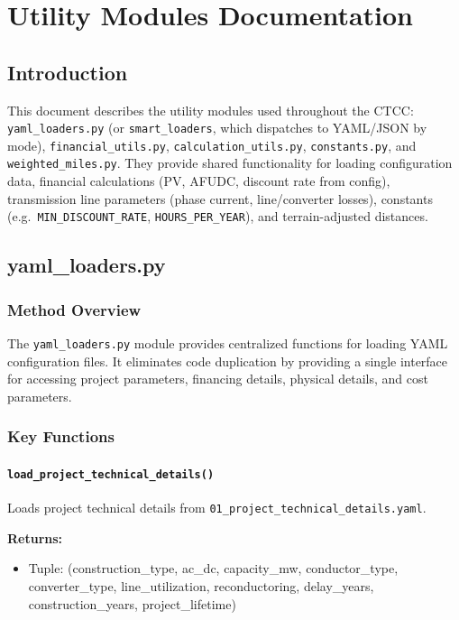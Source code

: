 \documentclass[ctcc_full_documentation.tex]{subfiles}
\begin{document}
\chapter{Utility Modules Documentation}

\section{Introduction}

This document describes the utility modules used throughout the CTCC: \texttt{yaml\_loaders.py} (or \texttt{smart\_loaders}, which dispatches to YAML/JSON by mode), \texttt{financial\_utils.py}, \texttt{calculation\_utils.py}, \texttt{constants.py}, and \texttt{weighted\_miles.py}. They provide shared functionality for loading configuration data, financial calculations (PV, AFUDC, discount rate from config), transmission line parameters (phase current, line/converter losses), constants (e.g.\ \texttt{MIN\_DISCOUNT\_RATE}, \texttt{HOURS\_PER\_YEAR}), and terrain-adjusted distances.

\section{yaml\_loaders.py}

\subsection{Method Overview}

The \texttt{yaml\_loaders.py} module provides centralized functions for loading YAML configuration files. It eliminates code duplication by providing a single interface for accessing project parameters, financing details, physical details, and cost parameters.

\subsection{Key Functions}

\subsubsection{\texttt{load\_project\_technical\_details()}}

Loads project technical details from \texttt{01\_project\_technical\_details.yaml}.

\textbf{Returns:}
\begin{itemize}
    \item Tuple: (construction\_type, ac\_dc, capacity\_mw, conductor\_type, converter\_type, line\_utilization, reconductoring, delay\_years, construction\_years, project\_lifetime)
\end{itemize}
\end{document}
